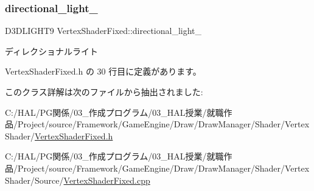 \subsubsection{\texorpdfstring{directional\+\_\+light\+\_\+}{directional\_light\_}}
{\footnotesize\ttfamily D3\+D\+L\+I\+G\+H\+T9 Vertex\+Shader\+Fixed\+::directional\+\_\+light\+\_\+\hspace{0.3cm}{\ttfamily [private]}}



ディレクショナルライト 



 Vertex\+Shader\+Fixed.\+h の 30 行目に定義があります。



このクラス詳解は次のファイルから抽出されました\+:\begin{DoxyCompactItemize}
\item 
C\+:/\+H\+A\+L/\+P\+G関係/03\+\_\+作成プログラム/03\+\_\+\+H\+A\+L授業/就職作品/\+Project/source/\+Framework/\+Game\+Engine/\+Draw/\+Draw\+Manager/\+Shader/\+Vertex\+Shader/\mbox{\hyperlink{_vertex_shader_fixed_8h}{Vertex\+Shader\+Fixed.\+h}}\item 
C\+:/\+H\+A\+L/\+P\+G関係/03\+\_\+作成プログラム/03\+\_\+\+H\+A\+L授業/就職作品/\+Project/source/\+Framework/\+Game\+Engine/\+Draw/\+Draw\+Manager/\+Shader/\+Vertex\+Shader/\+Source/\mbox{\hyperlink{_vertex_shader_fixed_8cpp}{Vertex\+Shader\+Fixed.\+cpp}}\end{DoxyCompactItemize}

